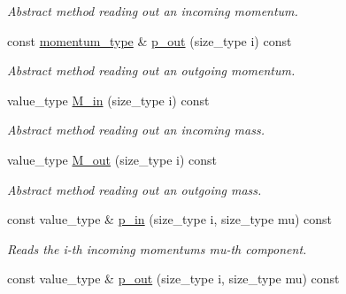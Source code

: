 \begin{DoxyCompactItemize}
\begin{DoxyCompactList}\small\item\em Abstract method reading out an incoming momentum. \end{DoxyCompactList}\item 
\hypertarget{a00544_a1814975d91cf8557553b0c7837efa701}{}const \hyperlink{a00579}{momentum\+\_\+type} \& \hyperlink{a00544_a1814975d91cf8557553b0c7837efa701}{p\+\_\+out} (size\+\_\+type i) const \label{a00544_a1814975d91cf8557553b0c7837efa701}

\begin{DoxyCompactList}\small\item\em Abstract method reading out an outgoing momentum. \end{DoxyCompactList}\item 
\hypertarget{a00544_a012809a8d53889ddfde2366a96dad270}{}value\+\_\+type \hyperlink{a00544_a012809a8d53889ddfde2366a96dad270}{M\+\_\+in} (size\+\_\+type i) const \label{a00544_a012809a8d53889ddfde2366a96dad270}

\begin{DoxyCompactList}\small\item\em Abstract method reading out an incoming mass. \end{DoxyCompactList}\item 
\hypertarget{a00544_a4dcd463da5393779dcf6f325f4ed4c2d}{}value\+\_\+type \hyperlink{a00544_a4dcd463da5393779dcf6f325f4ed4c2d}{M\+\_\+out} (size\+\_\+type i) const \label{a00544_a4dcd463da5393779dcf6f325f4ed4c2d}

\begin{DoxyCompactList}\small\item\em Abstract method reading out an outgoing mass. \end{DoxyCompactList}\item 
\hypertarget{a00544_abd55d011bd1512b10f7b177dee803119}{}const value\+\_\+type \& \hyperlink{a00544_abd55d011bd1512b10f7b177dee803119}{p\+\_\+in} (size\+\_\+type i, size\+\_\+type mu) const \label{a00544_abd55d011bd1512b10f7b177dee803119}

\begin{DoxyCompactList}\small\item\em Reads the i-\/th incoming momentum\textquotesingle{}s mu-\/th component. \end{DoxyCompactList}\item 
\hypertarget{a00544_a4a86879a5dafe541b12a6cd133464e41}{}const value\+\_\+type \& \hyperlink{a00544_a4a86879a5dafe541b12a6cd133464e41}{p\+\_\+out} (size\+\_\+type i, size\+\_\+type mu) const \label{a00544_a4a86879a5dafe541b12a6cd133464e41}


\end{DoxyCompactItemize}
